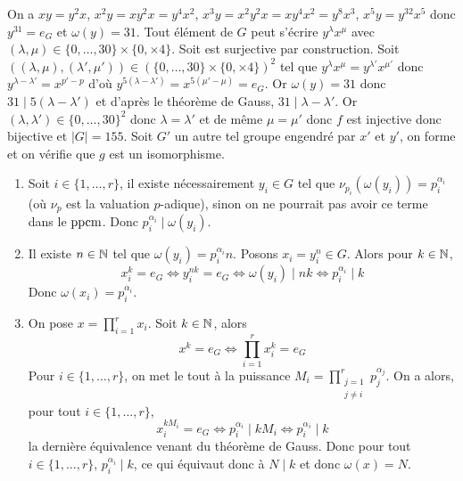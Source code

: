 \begin{solution}
	On a $xy=y^{2}x$, $x^{2}y=xy^{2}x=y^{4}x^{2}$, $x^{3}y=x^{2}y^{2}x=xy^{4}x^{2}=y^{8}x^{3}$, $x^{5}y=y^{32}x^{5}$ donc $y^{31}=e_{G}$ et $\omega(y)=31$. Tout élément de $G$ peut s'écrire $y^{\lambda}x^{\mu}$ avec $(\lambda,\mu)\in\{0,\dots,30\}\times\{0,\times 4\}$. Soit  est surjective par construction. Soit $((\lambda,\mu),(\lambda',\mu'))\in(\{0,\dots,30\}\times\{0,\times 4\})^{2}$ tel que $y^{\lambda}x^{\mu}=y^{\lambda'}x^{\mu'}$ donc $y^{\lambda-\lambda'}=x^{p'-p}$ d'où $y^{5(\lambda-\lambda')}=x^{5(\mu'-\mu)}=e_{G}$. Or $\omega(y)=31$ donc $31\mid 5(\lambda-\lambda')$ et d'après le théorème de Gauss, $31\mid \lambda-\lambda'$. Or $(\lambda,\lambda')\in\{0,\dots,30\}^{2}$ donc $\lambda=\lambda'$ et de même $\mu=\mu'$ donc $f$ est injective donc bijective et $\vert G\vert=155$. Soit $G'$ un autre tel groupe engendré par $x'$ et $y'$, on forme 
	et on vérifie que $g$ est un isomorphisme.
\end{solution}

\begin{solution}
	\phantom{}
	\begin{enumerate}
		\item Soit $i\in\{1,\dots,r\}$, il existe nécessairement $y_{i}\in G$ tel que $\nu_{p_{i}}(\omega(y_{i}))=p_{i}^{\alpha_{i}}$ (où $\nu_{p}$ est la valuation $p$-adique), sinon on ne pourrait pas avoir ce terme dans le $\operatorname{ppcm}$. Donc $p_{i}^{\alpha_{i}}\mid \omega(y_{i})$.
		
		\item Il existe $n\in\mathbb{N}$ tel que $\omega(y_{i})=p_{i}^{\alpha_{i}}n$. Posons $x_{i}=y_{i}^{n}\in G$. Alors pour $k\in\mathbb{N}$,
		$$x_{i}^{k}=e_{G}\Longleftrightarrow y_{i}^{nk}=e_{G}\Longleftrightarrow \omega(y_{i})\mid nk\Longleftrightarrow p_{i}^{\alpha_{i}}\mid k$$
		Donc $\omega(x_{i})=p_{i}^{\alpha_{i}}$.

		\item On pose $x=\prod_{i=1}^{r}x_{i}$. Soit $k\in\mathbb{N}$, alors 
		$$x^{k}=e_{G}\Longleftrightarrow \prod_{i=1}^{r}x_{i}^{k}=e_{G}$$
		Pour $i\in\{1,\dots,r\}$, on met le tout à la puissance $M_{i}=\prod_{\substack{j=1\\j\neq i}}^{r}p_{j}^{\alpha_{j}}$. On a alors, pour tout $i\in\{1,\dots,r\}$,
		$$x_{i}^{kM_{i}}=e_{G}\Longleftrightarrow p_{i}^{\alpha_{i}}\mid kM_{i}\Longleftrightarrow p_{i}^{\alpha_{i}}\mid k$$
		la dernière équivalence venant du théorème de Gauss. Donc pour tout $i\in\{1,\dots,r\}$, $p_{i}^{\alpha_{i}}\mid k$, ce qui équivaut donc à $N\mid k$ et donc $\omega(x)=N$.
	\end{enumerate}
\end{solution}

